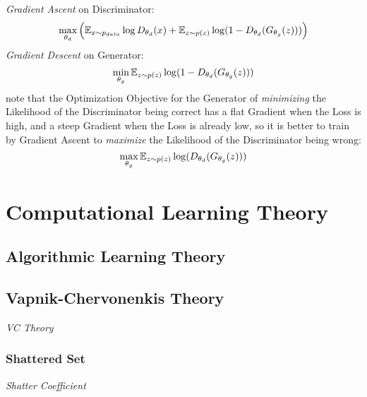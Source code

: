 \emph{Gradient Ascent} on Discriminator:
\[
  \max_{\theta_d} \Big(
    \mathbb{E}_{x \sim p_{data}} \log D_{\theta_d}(x) +
    \mathbb{E}_{z \sim p(z)} \log (1 - D_{\theta_d}(G_{\theta_g}(z)))
  \Big)
\]
\emph{Gradient Descent} on Generator:
\[
  \min_{\theta_g} \mathbb{E}_{z \sim p(z)} \log (1 - D_{\theta_d}(G_{\theta_g}(z)))
\]
note that the Optimization Objective for the Generator of \emph{minimizing} the
Likelihood of the Discriminator being correct has a flat Gradient when the Loss
is high, and a steep Gradient when the Loss is already low, so it is better to
train by Gradient Ascent to \emph{maximize} the Likelihood of the Discriminator
being wrong:
\[
  \max_{\theta_g} \mathbb{E}_{z \sim p(z)} \log (D_{\theta_d}(G_{\theta_g}(z)))
\]



\section{Computational Learning Theory}\label{sec:computational_learning_theory}




\subsection{Algorithmic Learning Theory}\label{sec:algorithmic_learning}

\subsection{Vapnik-Chervonenkis Theory}\label{sec:vc_theory}

\emph{VC Theory}



\subsubsection{Shattered Set}\label{sec:shattered_set}

\emph{Shatter Coefficient}



